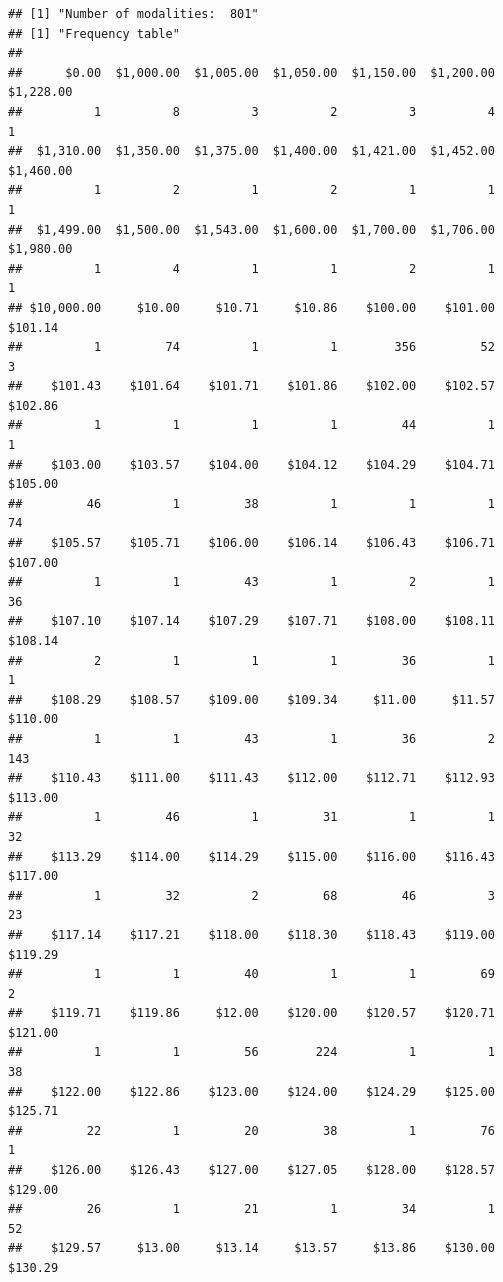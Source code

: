 \begin{verbatim}
## [1] "Number of modalities:  801"
## [1] "Frequency table"
## 
##      $0.00  $1,000.00  $1,005.00  $1,050.00  $1,150.00  $1,200.00  $1,228.00 
##          1          8          3          2          3          4          1 
##  $1,310.00  $1,350.00  $1,375.00  $1,400.00  $1,421.00  $1,452.00  $1,460.00 
##          1          2          1          2          1          1          1 
##  $1,499.00  $1,500.00  $1,543.00  $1,600.00  $1,700.00  $1,706.00  $1,980.00 
##          1          4          1          1          2          1          1 
## $10,000.00     $10.00     $10.71     $10.86    $100.00    $101.00    $101.14 
##          1         74          1          1        356         52          3 
##    $101.43    $101.64    $101.71    $101.86    $102.00    $102.57    $102.86 
##          1          1          1          1         44          1          1 
##    $103.00    $103.57    $104.00    $104.12    $104.29    $104.71    $105.00 
##         46          1         38          1          1          1         74 
##    $105.57    $105.71    $106.00    $106.14    $106.43    $106.71    $107.00 
##          1          1         43          1          2          1         36 
##    $107.10    $107.14    $107.29    $107.71    $108.00    $108.11    $108.14 
##          2          1          1          1         36          1          1 
##    $108.29    $108.57    $109.00    $109.34     $11.00     $11.57    $110.00 
##          1          1         43          1         36          2        143 
##    $110.43    $111.00    $111.43    $112.00    $112.71    $112.93    $113.00 
##          1         46          1         31          1          1         32 
##    $113.29    $114.00    $114.29    $115.00    $116.00    $116.43    $117.00 
##          1         32          2         68         46          3         23 
##    $117.14    $117.21    $118.00    $118.30    $118.43    $119.00    $119.29 
##          1          1         40          1          1         69          2 
##    $119.71    $119.86     $12.00    $120.00    $120.57    $120.71    $121.00 
##          1          1         56        224          1          1         38 
##    $122.00    $122.86    $123.00    $124.00    $124.29    $125.00    $125.71 
##         22          1         20         38          1         76          1 
##    $126.00    $126.43    $127.00    $127.05    $128.00    $128.57    $129.00 
##         26          1         21          1         34          1         52 
##    $129.57     $13.00     $13.14     $13.57     $13.86    $130.00    $130.29 

\end{verbatim}
